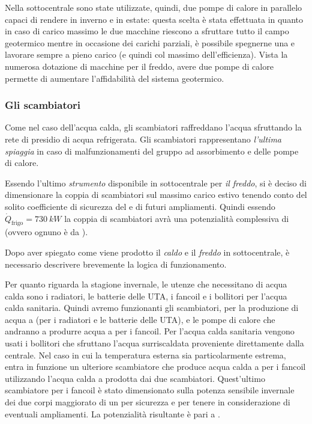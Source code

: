 

Nella sottocentrale sono state utilizzate, quindi, due pompe di calore in parallelo capaci di rendere in inverno  e  in estate: questa scelta è stata effettuata in quanto in caso di carico massimo le due macchine riescono a sfruttare tutto il campo geotermico mentre in occasione dei carichi parziali, è possibile spegnerne una e lavorare sempre a pieno carico (e quindi col massimo dell'efficienza). Vista la numerosa dotazione di macchine per il freddo, avere due pompe di calore permette di aumentare l'affidabilità del sistema geotermico.
\subsubsection{Gli scambiatori}
Come nel caso dell'acqua calda, gli scambiatori raffreddano l'acqua sfruttando la rete di presidio di acqua refrigerata. Gli scambiatori rappresentano \emph{l'ultima spiaggia} in caso di malfunzionamenti del gruppo ad assorbimento e delle pompe di calore.

Essendo l'ultimo \emph{strumento} disponibile in sottocentrale per \emph{il freddo}, si è deciso di dimensionare la coppia di scambiatori sul massimo carico estivo tenendo conto del solito coefficiente di sicurezza del  e di futuri ampliamenti. Quindi essendo $\dot{Q}_{\mathrm{frigo}}= \SI{730}{kW}$ la coppia di scambiatori avrà una potenzialità complessiva di  (ovvero ognuno è da ).

\vspace{1em}

Dopo aver spiegato come viene prodotto il \emph{caldo} e il \emph{freddo} in sottocentrale, è necessario descrivere brevemente la logica di funzionamento.

Per quanto riguarda la stagione invernale, le utenze che necessitano di acqua calda sono i radiatori, le batterie delle UTA, i fancoil e i bollitori per l'acqua calda sanitaria. Quindi avremo funzionanti gli scambiatori, per la produzione di acqua a  (per i radiatori e le batterie delle UTA), e le pompe di calore che andranno a produrre acqua a  per i fancoil. Per l'acqua calda sanitaria vengono usati i bollitori che sfruttano l'acqua surriscaldata proveniente direttamente dalla centrale. Nel caso in cui la temperatura esterna sia particolarmente estrema, entra in funzione un ulteriore scambiatore che produce acqua calda a  per i fancoil utilizzando l'acqua calda a  prodotta dai due scambiatori. Quest'ultimo scambiatore per i fancoil è stato dimensionato sulla potenza sensibile invernale dei due corpi maggiorato di un  per sicurezza e per tenere in considerazione di eventuali ampliamenti. La potenzialità risultante è pari a . 

